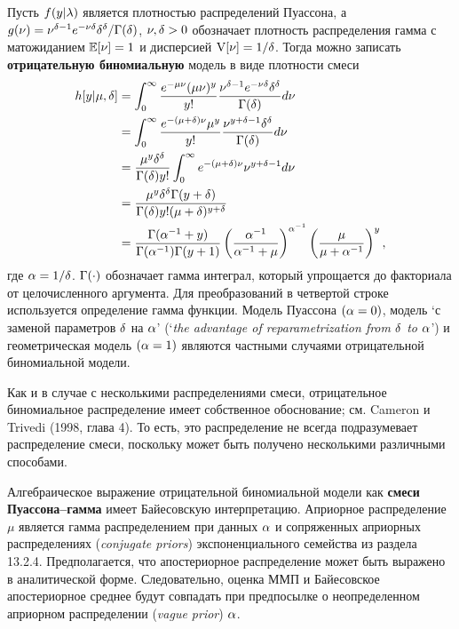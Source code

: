Пусть $f(y|\lambda)$ является плотностью распределений Пуассона, а $g(\nu) = \nu^{\delta - 1}e^{-\nu\delta}\delta^\delta / \Gamma(\delta)$, $\nu, \delta > 0$ обозначает плотность распределения гамма с матожиданием $\mathbb{E}[\nu] = 1$ и дисперсией $\mathrm{V}[\nu] = 1/\delta$. Тогда можно записать \textbf{отрицательную биномиальную} модель в виде плотности смеси %
    \begin{align}\label{eq:20.12}
    h[y|\mu, \delta]   &= \int^{\infty}_{0} \frac{e^{-\mu\nu}(\mu\nu)^y}{y!} \frac{\nu^{\delta - 1}e^{-\nu\delta}\delta^\delta}{\Gamma(\delta)} d\nu \\
                    &= \int^{\infty}_{0} \frac{e^{-(\mu + \delta)\nu} \mu^y}{y!} \frac{\nu^{y + \delta - 1} \delta^\delta}{\Gamma(\delta)} d\nu \notag \\
                    &= \frac{\mu^y \delta^\delta}{\Gamma(\delta) y!} \int^{\infty}_{0} e^{-(\mu + \delta)\nu} \nu^{y + \delta - 1} d\nu \notag \\
                    &= \frac{\mu^y \delta^\delta \Gamma(y + \delta)}{\Gamma(\delta) y! (\mu + \delta)^{y + \delta}} \notag \\
                    &= \frac{\Gamma(\alpha^{-1} + y)}{\Gamma(\alpha^{-1}) \Gamma(y + 1)} \left( \frac{\alpha^{-1}}{\alpha^{-1} +\mu } \right)^{\alpha^{-1}} \left( \frac{\mu}{\mu + \alpha^{-1}} \right)^{y}, \notag
    \end{align}
где $\alpha = 1/\delta$. $\Gamma(\cdot)$ обозначает гамма интеграл, который упрощается до факториала от целочисленного аргумента. Для преобразований в четвертой строке используется определение гамма функции. Модель Пуассона $(\alpha = 0)$, модель `с заменой параметров $\delta$ на $\alpha$' (`\textit{the advantage of reparametrization from $\delta$ to $\alpha$}') и геометрическая модель $(\alpha = 1)$ являются частными случаями отрицательной биномиальной модели.

Как и в случае с несколькими распределениями смеси, отрицательное биномиальное распределение имеет собственное обоснование; см. Cameron и Trivedi (1998, глава 4). То есть, это распределение не всегда подразумевает распределение смеси, поскольку может быть получено несколькими различными способами.

Алгебраическое выражение отрицательной биномиальной модели как \textbf{смеси Пуассона--гамма} имеет Байесовскую интерпретацию. Априорное распределение $\mu$ является гамма распределением при данных $\alpha$ и сопряженных априорных распределениях (\textit{conjugate priors}) экспоненциального семейства из раздела 13.2.4. Предполагается, что апостериорное распределение может быть выражено в аналитической форме. Следовательно, оценка ММП и Байесовское апостериорное среднее будут совпадать при предпосылке о неопределенном априорном распределении (\textit{vague prior}) $\alpha$.

